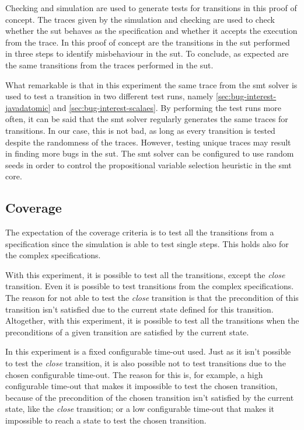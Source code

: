Checking and simulation are used to generate tests for transitions in this proof
of concept. The traces given by the simulation and checking are used to check
whether the \gls{sut} behaves as the specification and whether it accepts the
execution from the trace. In this proof of concept are the transitions in the
\gls{sut} performed in three steps to identify misbehaviour in the \gls{sut}.
To conclude, as expected are the same transitions from the traces performed in
the \gls{sut}.

What remarkable is that in this experiment the same trace from the \gls{smt}
solver is used to test a transition in two different test runs, namely
\autoref{sec:bug-interest-javadatomic} and \autoref{sec:bug-interest-scalaes}.
By performing the test runs more often, it can be said that the \gls{smt} solver
regularly generates the same traces for transitions. In our case, this is not
bad, as long as every transition is tested despite the randomness of the traces.
However, testing unique traces may result in finding more bugs in the
\gls{sut}. The \gls{smt} solver can be configured to use random seeds in order
to control the propositional variable selection heuristic in the \gls{smt} core.


\subsection{Coverage}

The expectation of the coverage criteria is to test all the transitions from a
specification since the simulation is able to test single steps. This holds also
for the complex specifications.

With this experiment, it is possible to test all the transitions, except the
\textit{close} transition. Even it is possible to test transitions from the
complex specifications. The reason for not able to test the \textit{close}
transition is that the precondition of this transition isn't satisfied due to
the current state defined for this transition. Altogether, with this experiment,
it is possible to test all the transitions when the preconditions of a given
transition are satisfied by the current state.

In this experiment is a fixed configurable time-out used. Just as it isn't
possible to test the \textit{close} transition, it is also possible not to test
transitions due to the chosen configurable time-out.
The reason for this is, for example, a high configurable time-out that makes it
impossible to test the chosen transition, because of the precondition of the
chosen transition isn't satisfied by the current state, like the \textit{close}
transition; or a low configurable time-out that makes it impossible to reach a
state to test the chosen transition.

